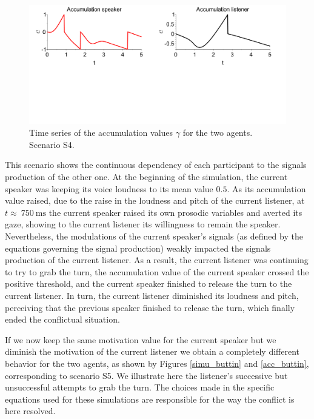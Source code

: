 \begin{figure}
  \centering
  \includegraphics[width=\linewidth]{figure/acc_sc4_small.pdf}
  \caption{Time series of the accumulation values $\gamma$ for the two agents. Scenario S4.}
  \label{inter_acc}
\end{figure}

This scenario shows the continuous dependency of each participant to the signals production of the other one. At the beginning of the simulation, the current speaker was keeping its voice loudness to its mean value $0.5$. As its accumulation value raised, due to the raise in the loudness and pitch of the current listener, at $t\approx~750~\text{ms}$ the current speaker raised its own prosodic variables and averted its gaze, showing to the current listener its willingness to remain the speaker. Nevertheless, the modulations of the current speaker's signals (as defined by the equations governing the signal production) weakly impacted the signals production of the current listener. As a result, the current listener was continuing to try to grab the turn, the accumulation value of the current speaker crossed the positive threshold, and the current speaker finished to release the turn to the current listener. In turn, the current listener diminished its loudness and pitch, perceiving that the previous speaker finished to release the turn, which finally ended the conflictual situation.

If we now keep the same motivation value for the current speaker but we diminish the motivation of the current listener we obtain a completely different behavior for the two agents, as shown by Figures \ref{simu_buttin} and \ref{acc_buttin}, corresponding to scenario S5. We illustrate here the listener's successive but unsuccessful attempts to grab the turn. The choices made in the specific equations used for these simulations are responsible for the way the conflict is here resolved.  

